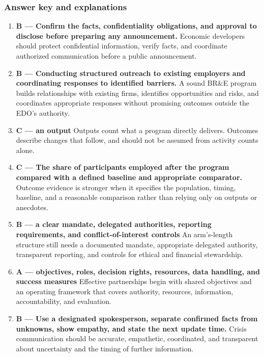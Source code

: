\documentclass[11pt,letterpaper,oneside,openany]{book}
\begin{document}
\subsubsection*{Answer key and explanations}
\begin{enumerate}[leftmargin=*,itemsep=.8em]
\item \textbf{B --- Confirm the facts, confidentiality obligations, and approval to disclose before preparing any announcement.} Economic developers should protect confidential information, verify facts, and coordinate authorized communication before a public announcement.
\item \textbf{B --- Conducting structured outreach to existing employers and coordinating responses to identified barriers.} A sound BR\&E program builds relationships with existing firms, identifies opportunities and risks, and coordinates appropriate responses without promising outcomes outside the EDO's authority.
\item \textbf{C --- an output} Outputs count what a program directly delivers. Outcomes describe changes that follow, and should not be assumed from activity counts alone.
\item \textbf{C --- The share of participants employed after the program compared with a defined baseline and appropriate comparator.} Outcome evidence is stronger when it specifies the population, timing, baseline, and a reasonable comparison rather than relying only on outputs or anecdotes.
\item \textbf{B --- a clear mandate, delegated authorities, reporting requirements, and conflict-of-interest controls} An arm's-length structure still needs a documented mandate, appropriate delegated authority, transparent reporting, and controls for ethical and financial stewardship.
\item \textbf{A --- objectives, roles, decision rights, resources, data handling, and success measures} Effective partnerships begin with shared objectives and an operating framework that covers authority, resources, information, accountability, and evaluation.
\item \textbf{B --- Use a designated spokesperson, separate confirmed facts from unknowns, show empathy, and state the next update time.} Crisis communication should be accurate, empathetic, coordinated, and transparent about uncertainty and the timing of further information.

\end{enumerate}
\end{document}
